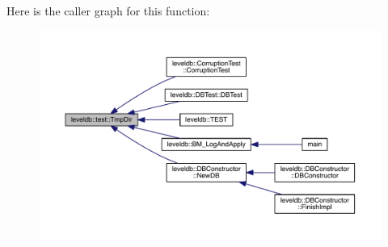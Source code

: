 Here is the caller graph for this function\+:\nopagebreak
\begin{figure}[H]
\begin{center}
\leavevmode
\includegraphics[width=350pt]{namespaceleveldb_1_1test_ac259aab85eedba03d163bb3a86ae4645_icgraph}
\end{center}
\end{figure}


